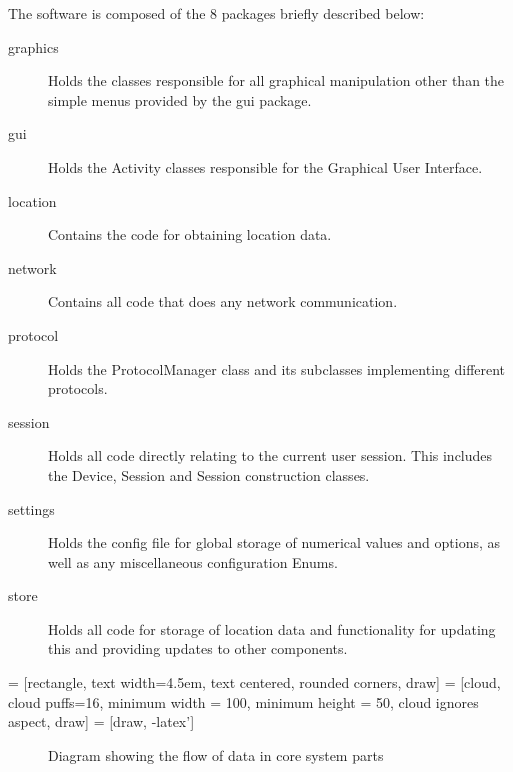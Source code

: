 The software is composed of the 8 packages briefly described below:
\begin{description}
\item[graphics]{Holds the classes responsible for all graphical manipulation other than the simple menus provided by the gui package.}
\item[gui]{Holds the Activity classes responsible for the Graphical User Interface.}
\item[location]{Contains the code for obtaining location data.}
\item[network]{Contains all code that does any network communication.}
\item[protocol]{Holds the ProtocolManager class and its subclasses implementing different protocols.}
\item[session]{Holds all code directly relating to the current user session. This includes the Device, Session and Session construction classes.}
\item[settings]{Holds the config file for global storage of numerical values and options, as well as any miscellaneous configuration Enums.}
\item[store]{Holds all code for storage of location data and functionality for updating this and providing updates to other components.}
\end{description}

 = [rectangle, text width=4.5em, text centered, rounded corners, draw]
 = [cloud, cloud puffs=16, minimum width = 100, minimum height = 50, cloud ignores aspect, draw]
 = [draw, -latex']
\begin{figure}[ht]
\centering
{}
\caption{Diagram showing the flow of data in core system parts}
\label{fig:dataflow}
\end{figure}

